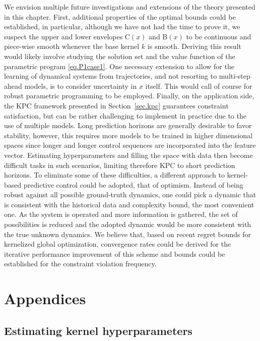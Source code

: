 We envision multiple future investigations and extensions of the theory presented in this chapter. First, additional properties of the optimal bounds could be established, in particular, although we have not had the time to prove it, we suspect the upper and lower envelopes C$(x)$ and B$(x)$ to be continuous and piece-wise smooth whenever the base kernel $k$ is smooth. Deriving this result would likely involve studying the solution set and the value function of the parametric program \eqref{eq.P1case1}.  One necessary extension to allow for the learning of dynamical systems from trajectories, and not resorting to multi-step ahead models, is to consider uncertainty in $x$ itself. This would call of course for robust parametric programming to be employed. Finally, on the application side, the KPC framework presented in Section~\ref{sec.kpc} guarantees constraint satisfaction, but can be rather challenging to implement in practice due to the use of multiple models. Long prediction horizons are generally desirable to favor stability, however, this requires more models to be trained in higher dimensional spaces since longer and longer control sequences are incorporated into the feature vector. Estimating hyperparameters and filling the space with data then become difficult tasks in such scenarios, limiting therefore KPC to short prediction horizons. To eliminate some of these difficulties, a different approach to kernel-based predictive control could be adopted, that of optimism. Instead of being robust against all possible ground-truth dynamics, one could pick a dynamic that is consistent with the historical data and complexity bound, the most convenient one. As the system is operated and more information is gathered, the set of possibilities is reduced and the adopted dynamic would be more consistent with the true unknown dynamics. We believe that, based on recent regret bounds for kernelized global optimization, convergence rates could be derived for the iterative performance improvement of this scheme and bounds could be established for the constraint violation frequency.

\section{Appendices}

\subsection{Estimating kernel hyperparameters}
\label{sec.appendix_hyerparams}

